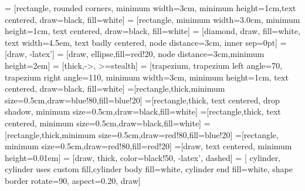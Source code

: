 \newcommand{\background}[5]{%
\begin{pgfonlayer}{background}
\path (#1.west |- #2.north)+(-0.5,0.25) node (a1) {};
\path (#3.east |- #4.south)+(+0.5,-0.25) node (a2) {};
\path[fill=gray!20,rounded corners, draw=black!50, dashed]
(a1) rectangle (a2);
\path (#3.east |- #2.north)+(0,0.25)--(#1.west |- #2.north) node[midway] (#5-n) {};
\path (#3.east |- #2.south)+(0,-0.35)--(#1.west |- #2.south) node[midway] (#5-s) {};
\path (#3.east |- #2.north)+(0.7,0)--(#3.east |- #4.south) node[midway] (#5-w) {};
\end{pgfonlayer}}

\newcommand{\transreceptor}[3]{%
\path [linepart] (#1.east) -- node [above]
{\scriptsize #2} (#3);}

 = [rectangle, rounded corners, minimum width=3cm, minimum height=1cm,text centered, draw=black, fill=white]
 = [rectangle, minimum width=3.0cm, minimum height=1cm, text centered, draw=black, fill=white]
 = [diamond, draw, fill=white, 
text width=4.5em, text badly centered, node distance=3cm, inner sep=0pt]
 = [draw, -latex']
 = [draw, ellipse,fill=red!20, node distance=3cm,minimum height=2em]
 = [thick,->, >=stealth]    
 = [trapezium, trapezium left angle=70, trapezium right angle=110, minimum width=3cm, minimum height=1cm, text centered, draw=black, fill=white]
=[rectangle,thick,minimum size=0.5cm,draw=blue!80,fill=blue!20]
=[rectangle,thick, text centered, drop shadow, minimum size=0.5cm,draw=black,fill=white]
=[rectangle,thick, text centered, minimum size=0.5cm,draw=black,fill=white]
=[rectangle,thick,minimum size=0.5cm,draw=red!80,fill=blue!20]
=[rectangle, minimum size=0.5cm,draw=red!80,fill=red!20]
=[draw, text centered, minimum height=0.01em]
 = [draw, thick, color=black!50, -latex', dashed]
= [ cylinder, cylinder uses custom fill,cylinder body fill=white, cylinder end fill=white, shape border rotate=90,      aspect=0.20, draw]
